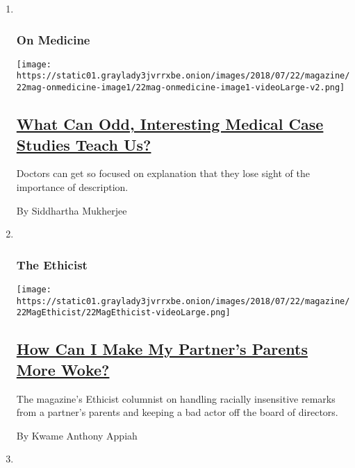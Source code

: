 \begin{enumerate}
\def\labelenumi{\arabic{enumi}.}
\item ~
  \hypertarget{on-medicine}{%
  \subsubsection{On Medicine}\label{on-medicine}}

  \texttt{[image: https://static01.graylady3jvrrxbe.onion/images/2018/07/22/magazine/22mag-onmedicine-image1/22mag-onmedicine-image1-videoLarge-v2.png]}

  \hypertarget{what-can-odd-interesting-medical-case-studies-teach-us}{%
  \subsection{\texorpdfstring{\href{/2018/07/17/magazine/what-can-odd-interesting-medical-case-studies-teach-us.html}{What
  Can Odd, Interesting Medical Case Studies Teach
  Us?}}{What Can Odd, Interesting Medical Case Studies Teach Us?}}\label{what-can-odd-interesting-medical-case-studies-teach-us}}

  Doctors can get so focused on explanation that they lose sight of the
  importance of description.

  By Siddhartha Mukherjee
\item ~
  \hypertarget{the-ethicist}{%
  \subsubsection{The Ethicist}\label{the-ethicist}}

  \texttt{[image: https://static01.graylady3jvrrxbe.onion/images/2018/07/22/magazine/22MagEthicist/22MagEthicist-videoLarge.png]}

  \hypertarget{how-can-i-make-my-partners-parents-more-woke}{%
  \subsection{\texorpdfstring{\href{/2018/07/17/magazine/how-can-i-make-my-partners-parents-more-woke.html}{How
  Can I Make My Partner's Parents More
  Woke?}}{How Can I Make My Partner's Parents More Woke?}}\label{how-can-i-make-my-partners-parents-more-woke}}

  The magazine's Ethicist columnist on handling racially insensitive
  remarks from a partner's parents and keeping a bad actor off the board
  of directors.

  By Kwame Anthony Appiah
\item ~
  \hypertarget{well}{%
}
\end{enumerate}
